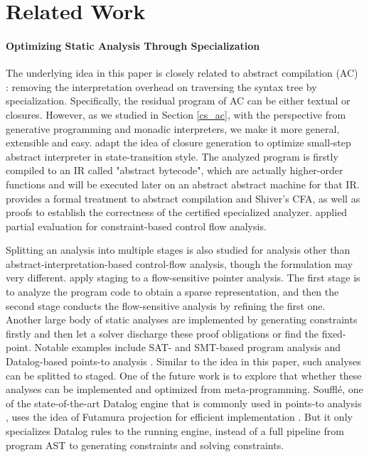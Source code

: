 \section{Related Work}

\paragraph{Optimizing Static Analysis Through Specialization}
The underlying idea in this paper is closely related to abstract
compilation (AC) \cite{Boucher:1996:ACN:647473.727587}: removing the
interpretation overhead on traversing the syntax tree by
specialization. Specifically, the residual program of AC can be either
textual or closures. However, as we studied in Section \ref{cs_ac},
with the perspective from generative programming and monadic
interpreters, we make it more general, extensible and easy.
\citet{Johnson:2013:OAA:2500365.2500604} adapt the idea of closure
generation to optimize small-step abstract interpreter in
state-transition style. The analyzed program is firstly compiled to an
IR called "abstract bytecode", which are actually higher-order
functions and will be executed later on an abstract abstract machine
for that IR. \citet{damian1999partial} provides a formal treatment to
abstract compilation and Shiver's CFA, as well as proofs to establish
the correctness of the certified specialized analyzer.
\citet{amtoft1999partial} applied partial evaluation for
constraint-based control flow analysis.

Splitting an analysis into multiple stages is also studied for
analysis other than abstract-interpretation-based control-flow
analysis, though the formulation may very
different. \citet{DBLP:conf/cgo/HardekopfL11} apply staging to a
flow-sensitive pointer analysis. The first stage is to analyze the
program code to obtain a sparse representation, and then the second
stage conducts the flow-sensitive analysis by refining the first
one. Another large body of static analyses are implemented by
generating constraints firstly and then let a solver discharge these
proof obligations or find the fixed-point. Notable examples include
SAT- and SMT-based program analysis
\cite{Gulwani:2008:PAC:1375581.1375616} and Datalog-based points-to
analysis \cite{Smaragdakis:2015:PA:2802194.2802195}.
Similar to the idea in this paper, such analyses can be splitted to
staged.  One of the future work is to explore that whether these
analyses can be implemented and optimized from
meta-programming. Souffl{\'e}, one of the state-of-the-art Datalog
engine that is commonly used in points-to analysis
\cite{Antoniadis:2017:PDS:3088515.3088522}, uses the idea of Futamura
projection for efficient implementation \cite{10.1007/978-3-319-41540-6_23}.
But it only specializes Datalog rules to the running engine, instead
of a full pipeline from program AST to generating constraints and
solving constraints.


